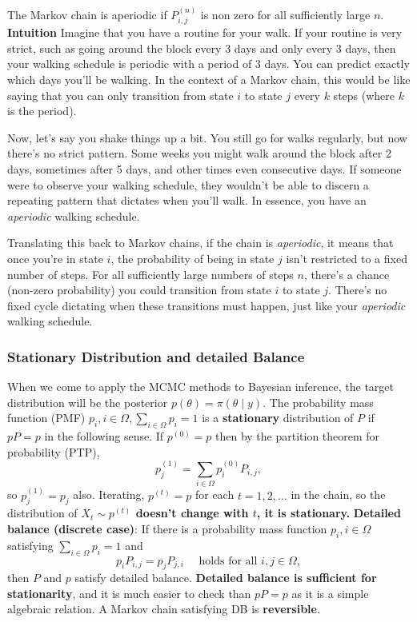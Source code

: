 \documentclass{article}
\begin{document}
The Markov chain is aperiodic if $P_{i, j}^{(n)}$ is non zero for all sufficiently large $n$.
\newline
\textbf{Intuition} \newline
Imagine that you have a routine for your walk. If your routine is very strict, such as going around the block every 3 days and only every 3 days, then your walking schedule is periodic with a period of 3 days. You can predict exactly which days you'll be walking. In the context of a Markov chain, this would be like saying that you can only transition from state \( i \) to state \( j \) every \( k \) steps (where \( k \) is the period).

Now, let's say you shake things up a bit. You still go for walks regularly, but now there's no strict pattern. Some weeks you might walk around the block after 2 days, sometimes after 5 days, and other times even consecutive days. If someone were to observe your walking schedule, they wouldn't be able to discern a repeating pattern that dictates when you'll walk. In essence, you have an \textit{aperiodic} walking schedule.

Translating this back to Markov chains, if the chain is \textit{aperiodic}, it means that once you're in state \( i \), the probability of being in state \( j \) isn't restricted to a fixed number of steps. For all sufficiently large numbers of steps \( n \), there's a chance (non-zero probability) you could transition from state \( i \) to state \( j \). There's no fixed cycle dictating when these transitions must happen, just like your \textit{aperiodic} walking schedule.

\subsubsection{Stationary Distribution and detailed Balance}
When we come to apply the MCMC methods to Bayesian inference, the target distribution will be the posterior $p(\theta)=\pi(\theta \mid y)$.
The probability mass function (PMF) $p_i, i \in \Omega, \sum_{i \in \Omega} p_i=1$ is a \textbf{stationary} distribution of $P$ if $p P=p$ in the following sense. If $p^{(0)}=p$ then by the partition theorem for probability (PTP),
$$
p_j^{(1)}=\sum_{i \in \Omega} p_i^{(0)} P_{i, j},
$$
so $p_j^{(1)}=p_j$ also. Iterating, $p^{(t)}=p$ for each $t=1,2, \ldots$ in the chain, so the distribution of \textbf{$X_t \sim p^{(t)}$ doesn't change with $t$, it is stationary.}
\newline
\textbf{Detailed balance (discrete case)}: If there is a probability mass function $p_i, i \in \Omega$ satisfying $\sum_{i \in \Omega} p_i=1$ and
$$
p_i P_{i, j}=p_j P_{j, i} \quad \text { holds for all } i, j \in \Omega,
$$
then $P$ and $p$ satisfy detailed balance.
\newline
\newline
\textbf{Detailed balance is sufficient for stationarity}, and it is much easier to check than $p P=p$ as it is a simple algebraic relation. A Markov chain satisfying DB is \textbf{reversible}.
\end{document}

